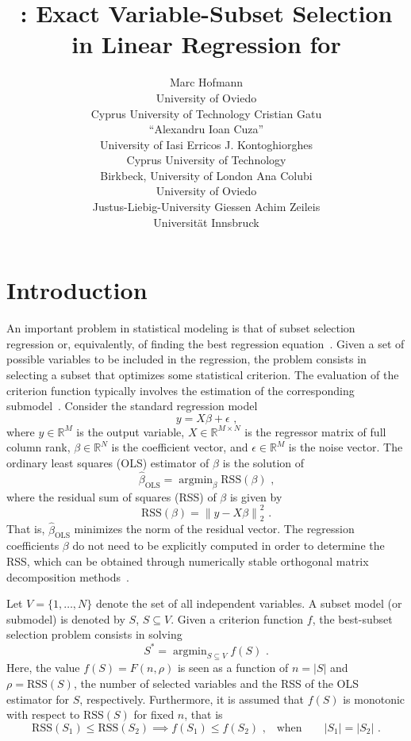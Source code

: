 \documentclass[article]{jss}
\author{
  Marc Hofmann\\University of Oviedo\\Cyprus University of Technology
  \And Cristian Gatu\\``Alexandru Ioan Cuza''\\University of Iasi
  \And Erricos J. Kontoghiorghes\\Cyprus University of Technology\\Birkbeck, University of London
  \AND Ana Colubi\\University of Oviedo\\Justus-Liebig-University Giessen
  \And Achim Zeileis\\Universit\"at Innsbruck
}
\title{\pkg{lmSubsets}: Exact Variable-Subset Selection in Linear Regression for \proglang{R}}
\newcommand{\Rset}{\mathbb{R}}
\newcommand{\rss}{\mathrm{RSS}}
\newcommand{\card}[1]{\left\lvert{#1}\right\rvert}
\newcommand{\norm}[1]{\left\lVert{#1}\right\lVert_2}
\DeclareMathOperator*{\argmin}{argmin}
\begin{document}
\vspace*{-0.5cm}

\section{Introduction}
\label{sec:intro}

An important problem in statistical modeling is that of subset
selection regression or, equivalently, of finding the best regression
equation~\citep{clarke:j_roy_stat_soc_c_app:81,hastie:01}.  Given a
set of possible variables to be included in the regression, the
problem consists in selecting a subset that optimizes some statistical
criterion.  The evaluation of the criterion function typically
involves the estimation of the corresponding
submodel~\citep{miller:02}.  Consider the standard regression model
%
\begin{equation}
  \label{eq:olm}
  y=X\beta+\epsilon\text{ ,}
\end{equation}
%
where $y\in\Rset^M$ is the output variable, $X\in\Rset^{M\times N}$ is
the regressor matrix of full column rank, $\beta\in\Rset^N$ is the
coefficient vector, and $\epsilon\in\Rset^M$ is the noise vector.  The
ordinary least squares (OLS) estimator of $\beta$ is the solution of
%
\begin{equation}
  \hat{\beta}_{\text{OLS}}=\argmin_{\beta}\rss(\beta)\text{ ,}
\end{equation}
%
where the residual sum of squares (RSS) of $\beta$ is given by
%
\begin{equation}
  \rss(\beta)=\norm{y-X\beta}^2\text{ .}
\end{equation}
%
That is, $\hat{\beta}_{\text{OLS}}$ minimizes the norm of the residual
vector.  The regression coefficients $\beta$ do not need to be
explicitly computed in order to determine the RSS, which can be
obtained through numerically stable orthogonal matrix decomposition
methods~\citep{golub:96}.
  
Let $V=\{1,\ldots,N\}$ denote the set of all independent variables.  A
subset model (or submodel) is denoted by $S$, $S\subseteq V$.  Given a
criterion function $f$, the best-subset selection problem consists in
solving
%
\begin{equation}
  \label{eq:best_subset}
  S^*=\argmin_{S\subseteq V}f(S)\text{ .}
\end{equation}
%
Here, the value $f(S)=F(n,\rho)$ is seen as a function of $n=\card{S}$
and $\rho=\rss(S)$, the number of selected variables and the RSS of
the OLS estimator for $S$, respectively.  Furthermore, it is assumed
that $f(S)$ is monotonic with respect to $\rss(S)$ for fixed $n$, that
is
%
\begin{equation}
  \label{eq:f:monotonicity}
  \rss(S_1)\leq\rss(S_2)\implies f(S_1)\leq f(S_2)\text{ ,}
  \quad\text{when}\quad
  \quad\card{S_1}=\card{S_2}\text{ .}
\end{equation}
\end{document}
